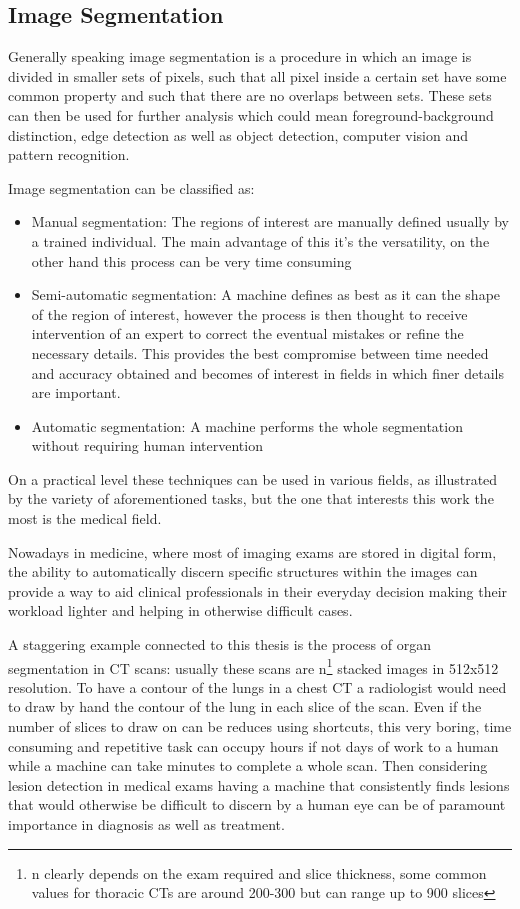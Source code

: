 \subsection{Image Segmentation}
Generally speaking image segmentation is a procedure in which an image is divided in smaller sets of pixels, such that all pixel inside a certain set have some common property and such that there are no overlaps between sets. These sets can then be used for further analysis which could mean foreground-background distinction, edge detection as well as object detection, computer vision and pattern recognition. 

Image segmentation can be classified as:

\begin{itemize}
\item Manual segmentation: The regions of interest are manually defined usually by a trained individual. The main advantage of this it's the versatility, on the other hand this process can be very time consuming
\item Semi-automatic segmentation: A machine defines as best as it can the shape of the region of interest, however the process is then thought to receive intervention of an expert to correct the eventual mistakes or refine the necessary details. This provides the best compromise between time needed and accuracy obtained and becomes of interest in fields in which finer details are important.
\item Automatic segmentation: A machine performs the whole segmentation without requiring human intervention
\end{itemize}

On a practical level these techniques can be used in various fields, as illustrated by the variety of aforementioned tasks, but the one that interests this work the most is the medical field.

Nowadays in medicine, where most of imaging exams are stored in digital form, the ability to automatically discern specific structures within the images can provide a way to aid clinical professionals in their everyday decision making their workload lighter and helping in otherwise difficult cases.

A staggering example connected to this thesis is the process of organ segmentation in CT scans: usually these scans are n\footnote{n clearly depends on the exam required and slice thickness, some common values for thoracic CTs are around 200-300 but can range up to 900 slices} stacked images in 512x512 resolution. To have a contour of the lungs in a chest CT a radiologist would need to draw by hand the contour of the lung in each slice of the scan. Even if the number of slices to draw on can be reduces using shortcuts, this very boring, time consuming and repetitive task can occupy hours if not days of work to a human while a machine can take minutes to complete a whole scan. Then considering lesion detection in medical exams having a machine that consistently finds lesions that would otherwise be difficult to discern by a human eye can be of paramount importance in diagnosis as well as treatment.

